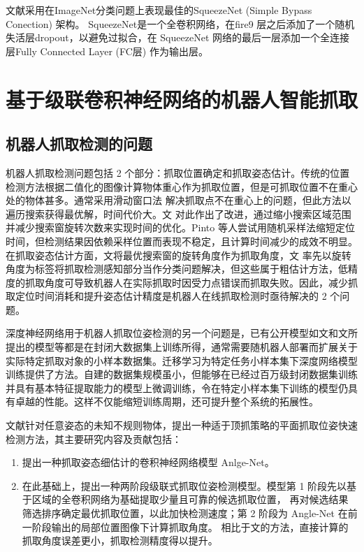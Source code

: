 \documentclass{hitszthesis}
\begin{document}
文献\cite{bib:one}采用在ImageNet分类问题上表现最佳的SqueezeNet (Simple Bypass  Conection) 架构。 SqueezeNet是一个全卷积网络，在f\/ire9 层之后添加了一个随机失活层dropout，以避免过拟合，在 SqueezeNet 网络的最后一层添加一个全连接层Fully Connected Layer (FC层) 作为输出层。

\section{基于级联卷积神经网络的机器人智能抓取}

\subsection{机器人抓取检测的问题}

机器人抓取检测问题包括 2 个部分：抓取位置确定和抓取姿态估计。传统的位置检测方法根据二值化的图像计算物体重心作为抓取位置，但是可抓取位置不在重心处的物体甚多。通常采用滑动窗口法 解决抓取点不在重心上的问题，但此方法以遍历搜索获得最优解，时间代价大。文\cite{bibb8} 对此作出了改进，通过缩小搜索区域范围并减少搜索窗旋转次数来实现时间的优化。Pinto 等人尝试用随机采样法缩短定位时间，但检测结果因依赖采样位置而表现不稳定，且计算时间减少的成效不明显。 在抓取姿态估计方面，文\cite{bibb7,bibb10}将最优搜索窗的旋转角度作为抓取角度，文\cite{bibb9} 率先以旋转角度为标签将抓取检测感知部分当作分类问题解决，但这些属于粗估计方法，低精度的抓取角度可导致机器人在实际抓取时因受力点错误而抓取失败。因此，减少抓取定位时间消耗和提升姿态估计精度是机器人在线抓取检测时亟待解决的 2 个问题。

深度神经网络用于机器人抓取位姿检测的另一个问题是，已有公开模型如文\cite{bibb7}和文\cite{bibb11}所提出的模型等都是在封闭大数据集上训练所得，通常需要随机器人部署而扩展关于实际特定抓取对象的小样本数据集。迁移学习为特定任务小样本集下深度网络模型训练提供了方法。自建的数据集规模虽小，但能够在已经过百万级封闭数据集训练并具有基本特征提取能力的模型上微调训练，令在特定小样本集下训练的模型仍具有卓越的性能。这样不仅能缩短训练周期，还可提升整个系统的拓展性。

文献\cite{bib:three}针对任意姿态的未知不规则物体，提出一种适于顶抓策略的平面抓取位姿快速检测方法，其主要研究内容及贡献包括：

\begin{enumerate}[fullwidth, label=(\arabic*), itemindent=2em]
\item 提出一种抓取姿态细估计的卷积神经网络模型 Anlge-Net。

\item 在此基础上，提出一种两阶段级联式抓取位姿检测模型。模型第 1 阶段先以基于区域的全卷积网络为基础提取少量且可靠的候选抓取位置， 再对候选结果筛选排序确定最优抓取位置，以此加快检测速度；第 2 阶段为 Angle-Net 在前一阶段输出的局部位置图像下计算抓取角度。 相比于文\cite{bibb9}的方法，直接计算的抓取角度误差更小，抓取检测精度得以提升。
\end{enumerate}
\end{document}
